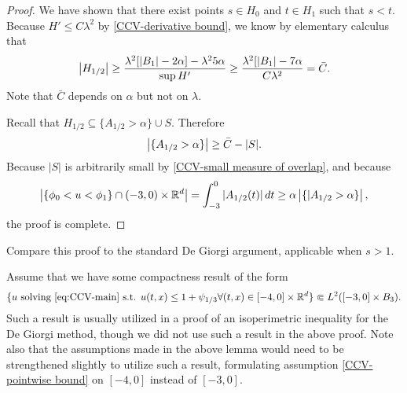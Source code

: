 \begin{proof}
We have shown that there exist points $s \in H_0$ and $t \in H_1$ such that $s < t$.  Because $H' \leq C \lambda^2$ by \eqref{CCV-derivative bound}, we know by elementary calculus that
\[ \left\lvert H_{1/2} \right\rvert \geq \frac{\lambda^2[|B_1|-2\alpha] - \lambda^2 5 \alpha }{\sup H'} \geq \frac{\lambda^2[|B_1| - 7\alpha }{C \lambda^2} = \bar{C}. \]
Note that $\bar{C}$ depends on $\alpha$ but not on $\lambda$.  

Recall that $H_{1/2} \subseteq \{A_{1/2} > \alpha \} \cup S$.  Therefore
\[ \left\lvert \{A_{1/2} > \alpha\} \right\rvert \geq \bar{C} - |S|. \]
Because $|S|$ is arbitrarily small by \eqref{CCV-small measure of overlap}, and because
\[ \left\lvert \{\phi_0 < u < \phi_1\} \cap (-3,0)\times \mathbb{R}^d \right\rvert = \int_{-3}^0 |A_{1/2}(t)| \,dt \geq \alpha \left\lvert \{|A_{1/2} > \alpha \} \right\rvert, \]
the proof is complete.  

\end{proof}





%
%

Compare this proof to the standard De Giorgi argument, applicable when $s > 1$.  

Assume that we have some compactness result of the form 
\[ \{u \textrm{ solving } \eqref{eq:CCV-main} \textrm{ s.t. } u(t,x) \leq 1 + \psi_{1/3} \forall (t,x) \in [-4,0]\times\mathbb{R}^d \} \Subset L^2([-3,0]\times B_3). \]
Such a result is usually utilized in a proof of an isoperimetric inequality for the De Giorgi method, though we did not use such a result in the above proof.  Note also that the assumptions made in the above lemma would need to be strengthened slightly to utilize such a result, formulating assumption \eqref{CCV-pointwise bound} on $[-4,0]$ instead of $[-3,0]$.  

